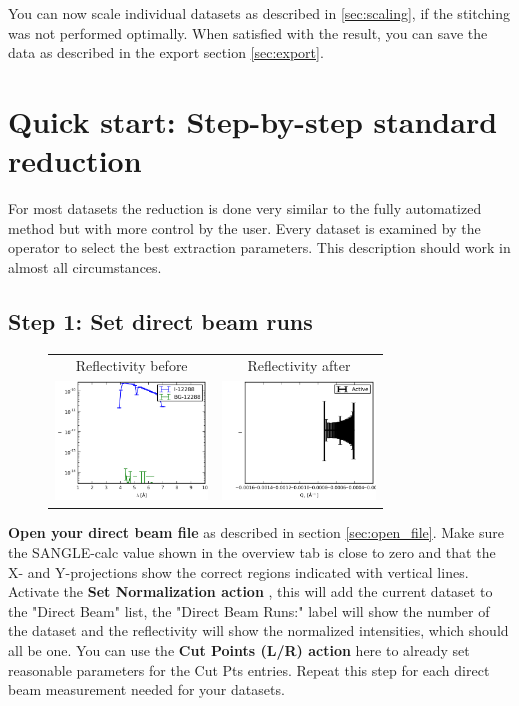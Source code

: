   
  You can now scale individual datasets as described in \ref{sec:scaling}, if the stitching was not performed optimally.
  When satisfied with the result, you can save the data as described in the export section \ref{sec:export}.
  
\clearpage
\section{Quick start: Step-by-step standard reduction}
\label{sec:quick_start}
  For most datasets the reduction is done very similar to the fully automatized method but with more control by the user.
  Every dataset is examined by the operator to select the best extraction parameters. This description should work in
  almost all circumstances.
  
  \subsection{Step 1: Set direct beam runs}
    \begin{figure}
    \begin{tabular}{cc}
        Reflectivity before & Reflectivity after \\
      \includegraphics[width=115pt]{screenshots/normalize3.png} & \includegraphics[width=115pt]{screenshots/normalize_after.png}
    \end{tabular}     
    \end{figure}
  
        \textbf{Open your direct beam file} as described in section \ref{sec:open_file}. 
      Make sure the SANGLE-calc value shown in the overview tab is close to zero and that the X- and Y-projections show the correct regions indicated with vertical lines.
      Activate the \textbf{Set Normalization action} , this will add the current dataset to the "Direct Beam" list, the "Direct Beam Runs:" label will show the number of the dataset and the reflectivity will show the normalized intensities, which should all be one. You can use the \textbf{Cut Points (L/R) action}  here to already set reasonable parameters for the Cut Pts entries.
      Repeat this step for each direct beam measurement needed for your datasets.

